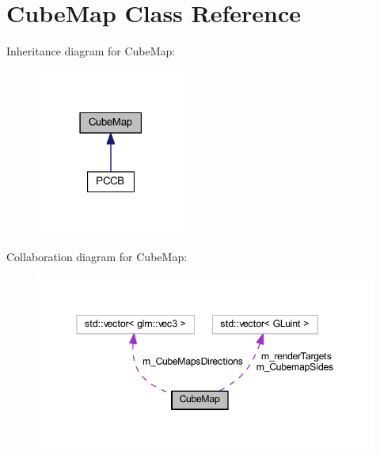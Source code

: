 \hypertarget{class_cube_map}{}\section{Cube\+Map Class Reference}
\label{class_cube_map}


Inheritance diagram for Cube\+Map\+:
\nopagebreak
\begin{figure}[H]
\begin{center}
\leavevmode
\includegraphics[width=138pt]{class_cube_map__inherit__graph}
\end{center}
\end{figure}


Collaboration diagram for Cube\+Map\+:
\nopagebreak
\begin{figure}[H]
\begin{center}
\leavevmode
\includegraphics[width=345pt]{class_cube_map__coll__graph}
\end{center}
\end{figure}
